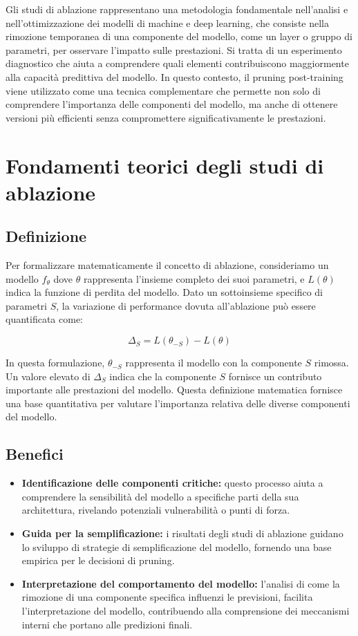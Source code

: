 \documentclass[a4paper,12pt]{report}
\begin{document}
	Gli studi di ablazione rappresentano una metodologia fondamentale nell'analisi e nell'ottimizzazione dei modelli di machine e deep learning, che consiste nella rimozione temporanea di una componente del modello, come un layer o gruppo di parametri, per osservare l'impatto sulle prestazioni. Si tratta di un esperimento diagnostico che aiuta a comprendere quali elementi contribuiscono maggiormente alla capacità predittiva del modello. In questo contesto, il pruning post-training viene utilizzato come una tecnica complementare che permette non solo di comprendere l'importanza delle componenti del modello, ma anche di ottenere versioni più efficienti senza compromettere significativamente le prestazioni.
	
	\section{Fondamenti teorici degli studi di ablazione}
	
	\subsection{Definizione}
	Per formalizzare matematicamente il concetto di ablazione, consideriamo un modello $f_\theta$ dove $\theta$ rappresenta l'insieme completo dei suoi parametri, e $L(\theta)$ indica la funzione di perdita del modello. Dato un sottoinsieme specifico di parametri $S$, la variazione di performance dovuta all'ablazione può essere quantificata come:
	
	\[
	\Delta_S = L(\theta_{-S}) - L(\theta)
	\]
	
	In questa formulazione, $\theta_{-S}$ rappresenta il modello con la componente $S$ rimossa. Un valore elevato di $\Delta_S$ indica che la componente $S$ fornisce un contributo importante alle prestazioni del modello. Questa definizione matematica fornisce una base quantitativa per valutare l'importanza relativa delle diverse componenti del modello.
	
	\subsection{Benefici}
	\begin{itemize}
		\item \textbf{Identificazione delle componenti critiche:} questo processo aiuta a comprendere la sensibilità del modello a specifiche parti della sua architettura, rivelando potenziali vulnerabilità o punti di forza.
		\item \textbf{Guida per la semplificazione:} i risultati degli studi di ablazione guidano lo sviluppo di strategie di semplificazione del modello, fornendo una base empirica per le decisioni di pruning.
		\item \textbf{Interpretazione del comportamento del modello:} l'analisi di come la rimozione di una componente specifica influenzi le previsioni, facilita l'interpretazione del modello, contribuendo alla comprensione dei meccanismi interni che portano alle predizioni finali.
	\end{itemize}
	
\end{document}
